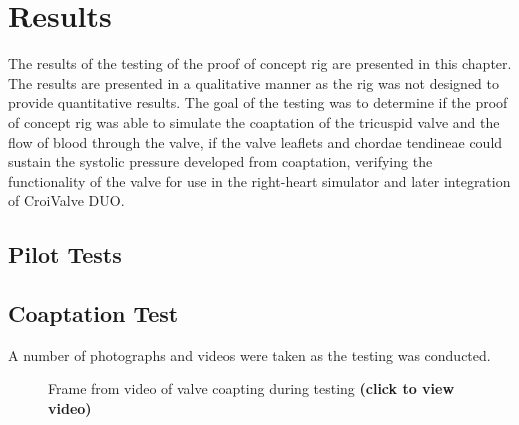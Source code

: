 \chapter{Results}\label{ch:results}
The results of the testing of the proof of concept rig are presented in this chapter. The results are presented in a qualitative manner as the rig was not designed to provide quantitative results.
The goal of the testing was to determine if the proof of concept rig was able to simulate the coaptation of the tricuspid valve and the flow of blood through the valve, if the valve leaflets and chordae tendineae could sustain the systolic pressure developed from coaptation, verifying the functionality of the valve for use in the right-heart simulator and later integration of CroiValve DUO.

\section{Pilot Tests}


\section{Coaptation Test}
A number of photographs and videos were taken as the testing was conducted.

\begin{figure}[t]
    \begin{fullwidth}
        \centering
        \quad
        \caption{Frame from video of valve coapting during testing \textbf{(click to view video)}}
        \label{fig:Videos}
    \end{fullwidth}
\end{figure}
